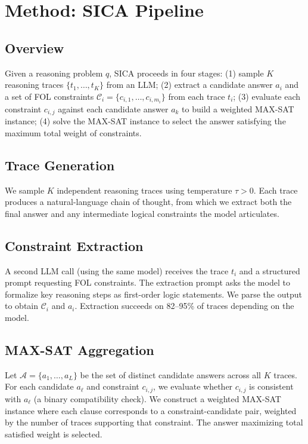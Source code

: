 \documentclass[11pt,a4paper]{article}
\begin{document}
\section{Method: SICA Pipeline}

\subsection{Overview}

Given a reasoning problem $q$, SICA proceeds in four stages:
(1) sample $K$ reasoning traces $\{t_1, \ldots, t_K\}$ from an LLM;
(2) extract a candidate answer $a_i$ and a set of FOL constraints $\mathcal{C}_i = \{c_{i,1}, \ldots, c_{i,m_i}\}$ from each trace $t_i$;
(3) evaluate each constraint $c_{i,j}$ against each candidate answer $a_k$ to build a weighted MAX-SAT instance;
(4) solve the MAX-SAT instance to select the answer satisfying the maximum total weight of constraints.

\subsection{Trace Generation}

We sample $K$ independent reasoning traces using temperature $\tau > 0$. Each trace produces a natural-language chain of thought, from which we extract both the final answer and any intermediate logical constraints the model articulates.

\subsection{Constraint Extraction}

A second LLM call (using the same model) receives the trace $t_i$ and a structured prompt requesting FOL constraints. The extraction prompt asks the model to formalize key reasoning steps as first-order logic statements. We parse the output to obtain $\mathcal{C}_i$ and $a_i$. Extraction succeeds on 82--95\% of traces depending on the model.

\subsection{MAX-SAT Aggregation}

Let $\mathcal{A} = \{a_1, \ldots, a_L\}$ be the set of distinct candidate answers across all $K$ traces. For each candidate $a_\ell$ and constraint $c_{i,j}$, we evaluate whether $c_{i,j}$ is consistent with $a_\ell$ (a binary compatibility check). We construct a weighted MAX-SAT instance where each clause corresponds to a constraint-candidate pair, weighted by the number of traces supporting that constraint. The answer maximizing total satisfied weight is selected.
\end{document}
